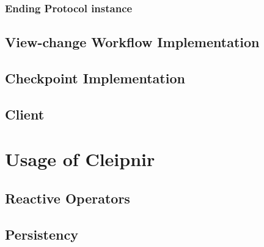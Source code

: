 \subsubsection{Ending Protocol instance}

\subsection{View-change Workflow Implementation}

\subsection{Checkpoint Implementation}

\subsection{Client}

\section{Usage of Cleipnir}

\subsection{Reactive Operators}

\subsection{Persistency}